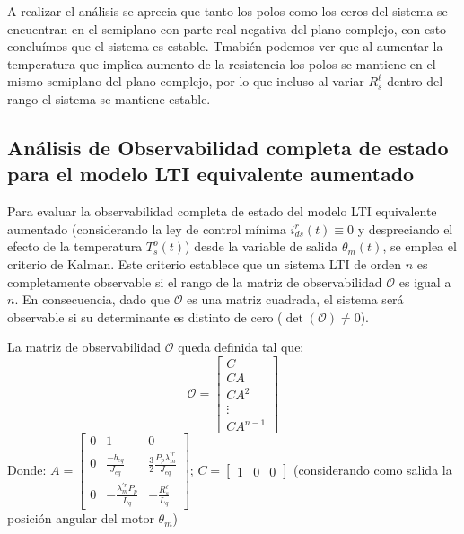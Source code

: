 \documentclass[blue,fullpaper]{ludusofficial}  %
\begin{document}
A realizar el análisis se aprecia que tanto los polos como los ceros del sistema se encuentran en el semiplano con parte real negativa del plano complejo, con esto concluímos que el sistema es estable. Tmabién podemos ver que al aumentar la temperatura que implica aumento de la resistencia los polos se mantiene en el mismo semiplano del plano complejo, por lo que incluso al variar $R^\ell_s$ dentro del rango el sistema se mantiene estable. 

\subsection{Análisis de Observabilidad completa de estado para el modelo LTI equivalente aumentado}
Para evaluar la observabilidad completa de estado del modelo LTI equivalente aumentado (considerando la ley de control mínima $i_{ds}^{r}(t) \equiv 0$  y despreciando el efecto de la temperatura $T_{s}^{o}(t)$) desde la variable de salida $\theta_m(t)$, se emplea el criterio de Kalman. Este criterio establece que un sistema LTI de orden $n$ es completamente observable si el rango de la matriz de observabilidad $\mathcal{O}$ es igual a $n$. En consecuencia, dado que $\mathcal{O}$ es una matriz cuadrada, el sistema será observable si su determinante es distinto de cero ($\det(\mathcal{O}) \neq 0$).

La matriz de observabilidad $\mathcal{O}$ queda definida tal que:
\begin{equation}
\label{eq:observabilidad-kalman}
\mathcal{O} = \begin{bmatrix}
C \\
CA \\
CA^2 \\
\vdots \\
CA^{n-1}
\end{bmatrix}
\end{equation}
Donde: 
$
A = \begin{bmatrix}
0 & 1 & 0 \\
0 & \frac{-b_{eq}}{J_{eq}} & \frac{3}{2}\frac{P_p\lambda_{m}^{'r}}{J_{eq}} \\
0 & -\frac{\lambda^{'r}_{m}P_p}{L_q} & -\frac{R^\ell_s}{L_q}
\end{bmatrix}
$;
$C=\begin{bmatrix}
    1& 0& 0
\end{bmatrix}$ (considerando como salida la posición
angular del motor $\theta_m$) 
\end{document}
